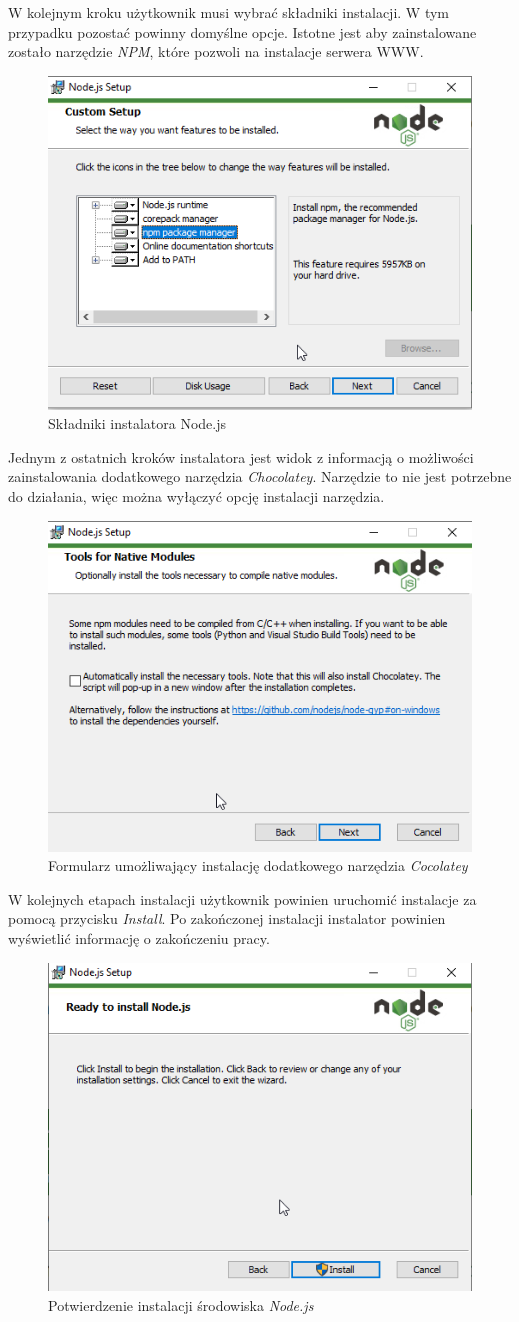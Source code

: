 \documentclass[a4paper,twoside,12pt]{book}
\begin{document}
W kolejnym kroku użytkownik musi wybrać składniki instalacji. W tym przypadku pozostać powinny domyślne opcje. Istotne jest aby zainstalowane zostało narzędzie \textit{NPM}, które pozwoli na instalacje serwera WWW.

\begin{figure}[H]
	\centering
	\includegraphics[width=0.5\linewidth]{../zrzuty_ekranu/instalacja_nodejs/node4}
	\caption{Składniki instalatora Node.js}
	\label{fig:node4}
\end{figure}

Jednym z ostatnich kroków instalatora jest widok z informacją o możliwości zainstalowania dodatkowego narzędzia \textit{Chocolatey}. Narzędzie to nie jest potrzebne do działania, więc można wyłączyć opcję instalacji narzędzia.

\begin{figure}[H]
	\centering
	\includegraphics[width=0.5\linewidth]{../zrzuty_ekranu/instalacja_nodejs/node5}
	\caption{Formularz umożliwający instalację dodatkowego narzędzia \textit{Cocolatey}}
	\label{fig:node5}
\end{figure}

W kolejnych etapach instalacji użytkownik powinien uruchomić instalacje za pomocą przycisku \textit{Install}. Po zakończonej instalacji instalator powinien wyświetlić informację o zakończeniu pracy.
\begin{figure}[H]
	\centering
	\includegraphics[width=0.5\linewidth]{../zrzuty_ekranu/instalacja_nodejs/node6}
	\caption{Potwierdzenie instalacji środowiska \textit{Node.js}}
	\label{fig:node6}
\end{figure}
\end{document}
